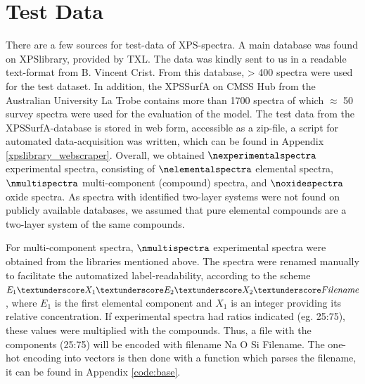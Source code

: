 
\section{Test Data}
\label{test_data}

There are a few sources for test-data of XPS-spectra. A main database was found on XPSlibrary, provided by TXL. The data was kindly sent to us in a readable text-format from B. Vincent Crist. From this database, > 400 spectra were used for the test dataset. In addition, the XPSSurfA on CMSS Hub from the Australian University La Trobe contains more than 1700 spectra of which $\approx$ 50 survey spectra were used for the evaluation of the model. The test data from the XPSSurfA-database is stored in web form, accessible as a zip-file, a script for automated data-acquisition was written, which can be found in Appendix \ref{xpslibrary_webscraper}.
Overall, we obtained $\nexperimentalspectra$ experimental spectra, consisting of $\nelementalspectra$ elemental spectra, $\nmultispectra$  multi-component (compound) spectra, and $\noxidespectra$ oxide spectra.
As spectra with identified two-layer systems were not found on publicly available databases, we assumed that pure elemental compounds are a two-layer system of the same compounds.

For multi-component spectra, $\nmultispectra$ experimental spectra were obtained from the libraries mentioned above. The spectra were renamed manually to facilitate the automatized label-readability, according to the scheme ${E_{1}\textunderscore X_{1} 	\textunderscore E_{2} 	\textunderscore X_{2} 	\textunderscore Filename}$, where $E_{1}$ is the first elemental component and $X_{1}$ is an integer providing its relative concentration. If experimental spectra had ratios indicated (eg. 25:75), these values were multiplied with the compounds. Thus, a file with the components  (25:75) will be encoded with filename Na  \textunderscore O  \textunderscore Si  \textunderscore Filename. The one-hot encoding into vectors is then done with a function which parses the filename, it can be found in Appendix \ref{code:base}.

